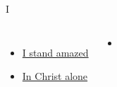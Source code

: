 \documentclass{beamer}
\begin{document}
\begin{frame}{I}
\begin{columns}
        \begin{itemize}
    \item \hyperlink{I stand amazed['How marvelous']}{I stand amazed } \phantom{ 1 1 1 1 1 1 1 1 1 1}
    \item \hyperlink{In Christ alone[]}{In Christ alone } \phantom{ 1 1 1 1 1 1 1 1 1 1}
\end{itemize}
        \begin{itemize}
            \item[] \phantom{1}\end{itemize}


\end{columns}

\end{frame}
\end{document}
